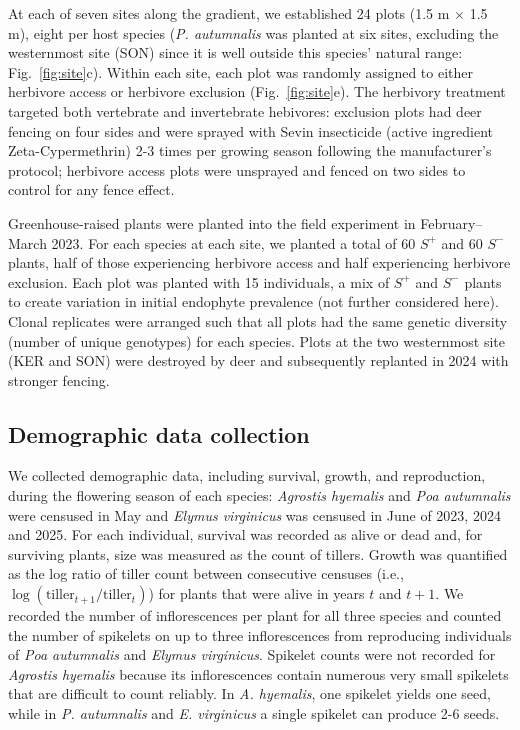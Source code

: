 \documentclass[12pt]{article}\usepackage[]{graphicx}\usepackage[dvipsnames]{xcolor}
\begin{document}
At each of seven sites along the gradient, we established 24 plots (1.5 m $\times$ 1.5 m), eight per host species (\textit{P. autumnalis} was planted at six sites, excluding the westernmost site (SON) since it is well outside this species' natural range: Fig.~\ref{fig:site}c). 
Within each site, each plot was randomly assigned to either herbivore access or herbivore exclusion (Fig.~\ref{fig:site}e). 
The herbivory treatment targeted both vertebrate and invertebrate hebivores: exclusion plots had deer fencing on four sides and were sprayed with Sevin insecticide (active ingredient Zeta-Cypermethrin) 2-3 times per growing season following the manufacturer's protocol; herbivore access plots were unsprayed and fenced on two sides to control for any fence effect.

Greenhouse-raised plants were planted into the field experiment in February--March 2023.
For each species at each site, we planted a total of 60 $S^+$ and 60 $S^-$ plants, half of those experiencing herbivore access and half experiencing herbivore exclusion. 
Each plot was planted with 15 individuals, a mix of $S^+$ and $S^-$ plants to create variation in initial endophyte prevalence (not further considered here). 
Clonal replicates were arranged such that all plots had the same genetic diversity (number of unique genotypes) for each species.  
Plots at the two westernmost site (KER and SON) were destroyed by deer and subsequently replanted in 2024 with stronger fencing. 

\subsection*{Demographic data collection}
We collected demographic data, including survival, growth, and reproduction, during the flowering season of each species: \emph{Agrostis hyemalis} and \emph{Poa autumnalis} were censused in May and \emph{Elymus virginicus} was censused in June of 2023, 2024 and 2025.
For each individual, survival was recorded as alive or dead and, for surviving plants, size was measured as the count of tillers.  
Growth was quantified as the log ratio of tiller count between consecutive censuses (i.e., $\log(\text{tiller}_{t+1}/\text{tiller}_{t})$) for plants that were alive in years $t$ and $t+1$.
We recorded the number of inflorescences per plant for all three species and counted the number of spikelets on up to three inflorescences from reproducing individuals of \emph{Poa autumnalis} and \emph{Elymus virginicus}. 
Spikelet counts were not recorded for \emph{Agrostis hyemalis} because its inflorescences contain numerous very small spikelets that are difficult to count reliably.
In \emph{A. hyemalis}, one spikelet yields one seed, while in \emph{P. autumnalis} and \emph{E. virginicus} a single spikelet can produce 2-6 seeds. 
\end{document}
